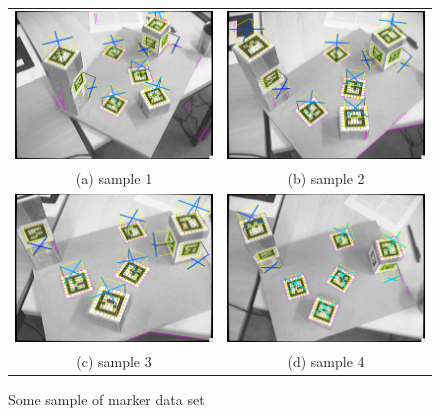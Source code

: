 \begin{figure}[H]  
\begin{tabular}{cc}
  \includegraphics[width=65mm]{figures/marker_frame_1} &  \includegraphics[width=65mm]{figures/marker_frame_2} \\
(a) sample 1 & (b) sample 2 \\[6pt]
  \includegraphics[width=65mm]{figures/marker_frame_3} &  \includegraphics[width=65mm]{figures/marker_frame_4} \\
(c) sample 3 & (d) sample 4 \\[6pt]
\end{tabular}
\caption{Some sample of marker data set}\label{fig:marker_ground_truth}
\end{figure}

